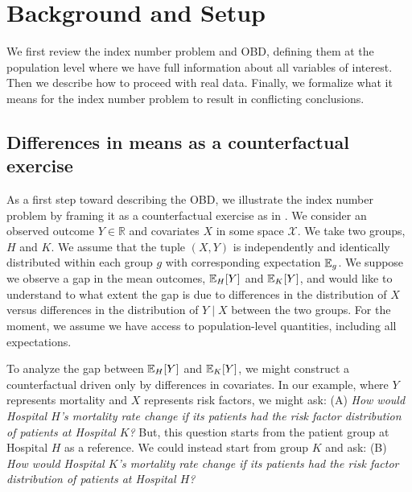 \section{Background and Setup}
\label{sec:counterfactual_OBD}

We first review the index number problem and OBD, defining them at the population level where we have full information about all variables of interest.
Then we describe how to proceed with real data.
Finally, we formalize what it means for the index number problem to result in conflicting conclusions.


\subsection{Differences in means as a counterfactual exercise} 
\label{sec:counterfactual_example}

As a first step toward describing the OBD, we illustrate the index number problem by framing it as a counterfactual exercise as in \citet{fortinLemieuxFirpo2011}.
We consider an observed outcome $Y \in \mathbb{R}$ and covariates $X$ in some space $\mathcal{X}$. We take two groups, $H$ and $K$. We assume that the tuple $(X,Y)$ is independently and identically distributed within each group $g$ with corresponding expectation $\mathbb{E}_g$. We suppose we observe a gap in the mean outcomes, $\mathbb{E}_H[Y]$ and $\mathbb{E}_K[Y]$, and would like to understand to what extent the gap is due to differences in the distribution of $X$ versus differences in the distribution of $Y\mid X$ between the two groups. 
For the moment, we assume we have access to population-level quantities, including all expectations.

To analyze the gap between $\mathbb{E}_H[Y]$ and $\mathbb{E}_K[Y]$, we might construct a counterfactual driven only by differences in covariates.
In our example, where $Y$ represents mortality and $X$ represents risk factors, we might ask:
(A) \emph{How would Hospital $H$'s mortality rate change if its patients had the risk factor distribution of patients at Hospital $K$?}
But, this question starts from the patient group at Hospital $H$ as a reference. We could instead start from group $K$ and ask:
(B) \emph{How would Hospital $K$'s mortality rate change if its patients had the risk factor distribution of patients at Hospital $H$?}


